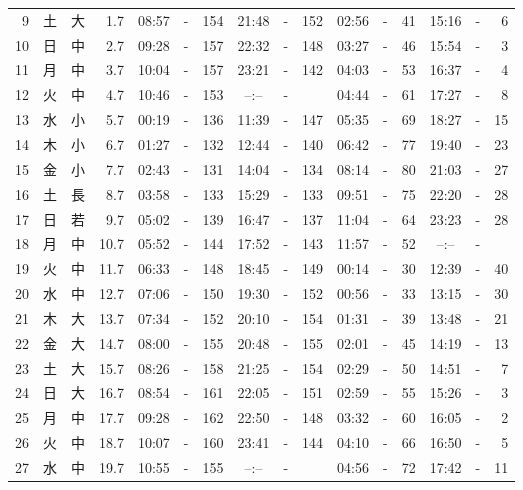 \documentclass[12pt.a4j]{jsarticle}
\begin{document}
\begin{center}
\begin{table}[ht]
\begin{tabular}{|rc|cr|ccrccr|ccrccr|}
 9 & 土 & 大 &  1.7 &  08:57 &-& 154  &  21:48 &-& 152  &   02:56 &-&  41  &   15:16 &-&   6  \\
10 & 日 & 中 &  2.7 &  09:28 &-& 157  &  22:32 &-& 148  &   03:27 &-&  46  &   15:54 &-&   3  \\
11 & 月 & 中 &  3.7 &  10:04 &-& 157  &  23:21 &-& 142  &   04:03 &-&  53  &   16:37 &-&   4  \\
12 & 火 & 中 &  4.7 &  10:46 &-& 153  &  --:-- &-&     &   04:44 &-&  61  &   17:27 &-&   8  \\
13 & 水 & 小 &  5.7 &  00:19 &-& 136  &  11:39 &-& 147  &   05:35 &-&  69  &   18:27 &-&  15  \\
14 & 木 & 小 &  6.7 &  01:27 &-& 132  &  12:44 &-& 140  &   06:42 &-&  77  &   19:40 &-&  23  \\
15 & 金 & 小 &  7.7 &  02:43 &-& 131  &  14:04 &-& 134  &   08:14 &-&  80  &   21:03 &-&  27  \\
16 & 土 & 長 &  8.7 &  03:58 &-& 133  &  15:29 &-& 133  &   09:51 &-&  75  &   22:20 &-&  28  \\
17 & 日 & 若 &  9.7 &  05:02 &-& 139  &  16:47 &-& 137  &   11:04 &-&  64  &   23:23 &-&  28  \\
18 & 月 & 中 & 10.7 &  05:52 &-& 144  &  17:52 &-& 143  &   11:57 &-&  52  &   --:-- &-&     \\
19 & 火 & 中 & 11.7 &  06:33 &-& 148  &  18:45 &-& 149  &   00:14 &-&  30  &   12:39 &-&  40  \\
20 & 水 & 中 & 12.7 &  07:06 &-& 150  &  19:30 &-& 152  &   00:56 &-&  33  &   13:15 &-&  30  \\
21 & 木 & 大 & 13.7 &  07:34 &-& 152  &  20:10 &-& 154  &   01:31 &-&  39  &   13:48 &-&  21  \\
22 & 金 & 大 & 14.7 &  08:00 &-& 155  &  20:48 &-& 155  &   02:01 &-&  45  &   14:19 &-&  13  \\
23 & 土 & 大 & 15.7 &  08:26 &-& 158  &  21:25 &-& 154  &   02:29 &-&  50  &   14:51 &-&   7  \\
24 & 日 & 大 & 16.7 &  08:54 &-& 161  &  22:05 &-& 151  &   02:59 &-&  55  &   15:26 &-&   3  \\
25 & 月 & 中 & 17.7 &  09:28 &-& 162  &  22:50 &-& 148  &   03:32 &-&  60  &   16:05 &-&   2  \\
26 & 火 & 中 & 18.7 &  10:07 &-& 160  &  23:41 &-& 144  &   04:10 &-&  66  &   16:50 &-&   5  \\
27 & 水 & 中 & 19.7 &  10:55 &-& 155  &  --:-- &-&     &   04:56 &-&  72  &   17:42 &-&  11  \\

\end{tabular}
\end{table}
\end{center}
\end{document}
